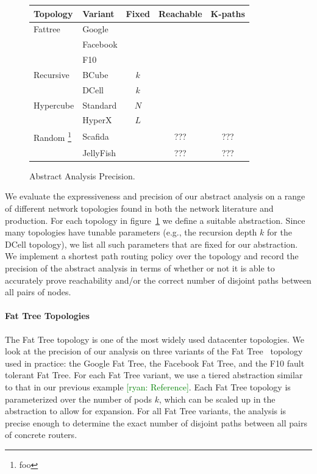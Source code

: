 \documentclass{sig-alternate-10pt}
\newcommand{\cmark}{\ding{51}}
\newcommand{\xmark}{\ding{55}}
\newcommand{\ryan}[1]{\textcolor{green}{[ryan: #1]}}
\newcommand{\para}[1]{\paragraph*{\textbf{#1}}}
\begin{document}
\begin{figure}[t!]
  \begin{center}
      \begin{tabular}{| l l | c | c | c |}
      \hline
      \textbf{Topology} & \textbf{Variant} & \textbf{Fixed} & \textbf{Reachable} & \textbf{K-paths} \\ \hline
      Fattree
         & Google &  & \cmark & \cmark  \\
         & Facebook &  & \cmark & \cmark \\
         & F10 &  & \cmark & \cmark \\ \hline
      Recursive
         & BCube & $k$ & \cmark & \xmark \\
         & DCell & $k$ & \cmark & \xmark \\ \hline
      Hypercube
         & Standard & $N$ & \cmark & \cmark \\
         & HyperX & $L$ & \cmark & \cmark \\ \hline
      Random \footnote{foo}
         & Scafida &  & ??? & ??? \\
         & JellyFish &  & ??? & ??? \\

      \hline
      \end{tabular}
  \end{center}
  \caption{Abstract Analysis Precision.}
  \label{fig:analysis-precision}
\end{figure}

We evaluate the expressiveness and precision of our abstract analysis on a range of different network topologies found in both the network literature and production. For each topology in figure~\ref{fig:analysis-precision} we define a suitable abstraction. Since many topologies have tunable parameters (e.g., the recursion depth $k$ for the DCell topology), we list all such parameters that are fixed for our abstraction. We implement a shortest path routing policy over the topology and record the precision of the abstract analysis in terms of whether or not it is able to accurately prove reachability and/or the correct number of disjoint paths between all pairs of nodes.

\para{Fat Tree Topologies}

The Fat Tree topology is one of the most widely used datacenter topologies. We look at the precision of our analysis on three variants of the Fat Tree~\cite{foo} topology used in practice: the Google Fat Tree, the Facebook Fat Tree, and the F10 fault tolerant Fat Tree. For each Fat Tree variant, we use a tiered abstraction similar to that in our previous example \ryan{Reference}. Each Fat Tree topology is parameterized over the number of pods $k$, which can be scaled up in the abstraction to allow for expansion. For all Fat Tree variants, the analysis is precise enough to determine the exact number of disjoint paths between all pairs of concrete routers.
\end{document}
